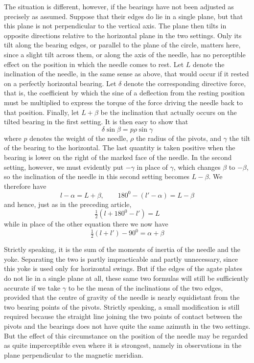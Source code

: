 The situation is different, however, if the bearings have not been adjusted as precisely as assumed. Suppose that their edges do lie in a single plane, but that this plane is not perpendicular to the vertical axis. The plane then tilts in opposite directions relative to the horizontal plane in the two settings. Only its tilt along the bearing edges, or parallel to the plane of the circle, matters here, since a slight tilt across them, or along the axis of the needle, has no perceptible effect on the position in which the needle comes to rest. Let $L$ denote the inclination of the needle, in the same sense as above, that would occur if it rested on a perfectly horizontal bearing. Let $\delta$ denote the corresponding directive force, that is, the coefficient by which the sine of a deflection from the resting position must be multiplied to express the torque of the force driving the needle back to that position. Finally, let $L+\beta$ be the inclination that actually occurs on the tilted bearing in the first setting. It is then easy to show that
\[
\delta\sin\beta=p\rho\sin\gamma
\]
where $p$ denotes the weight of the needle, $\rho$ the radius of the pivots, and $\gamma$ the tilt of the bearing to the horizontal. The last quantity is taken positive when the bearing is lower on the right of the marked face of the needle. In the second setting, however, we must evidently put $-\gamma$ in place of $\gamma$, which changes $\beta$ to $-\beta$, so the inclination of the needle in this second setting becomes $L-\beta$. We therefore have
\[
l-\alpha=L+\beta,\qquad180^0-(l'-\alpha)=L-\beta
\]
and hence, just as in the preceding article,
\[
\tfrac{1}{2}(l+180^0-l')=L
\]
while in place of the other equation there we now have
\[
\tfrac{1}{2}(l+l')-90^0=\alpha+\beta
\]


\expandafter\def\csname HistoricalNoteText465\endcsname{Strictly speaking, it is the sum of the moments of inertia of the needle and the yoke. Separating the two is partly impracticable and partly unnecessary, since this yoke is used only for horizontal swings.}
But if the edges of the agate plates do not lie in a single plane at all, these same two formulas will still be sufficiently accurate if we take $\gamma$ to be the mean of the inclinations of the two edges, provided that the centre of gravity of the needle is nearly equidistant from the two bearing points of the pivots. Strictly speaking, a small modification is still required because the straight line joining the two points of contact between the pivots and the bearings does not have quite the same azimuth in the two settings. But the effect of this circumstance on the position of the needle may be regarded as quite imperceptible even where it is strongest, namely in observations in the plane perpendicular to the magnetic meridian.

